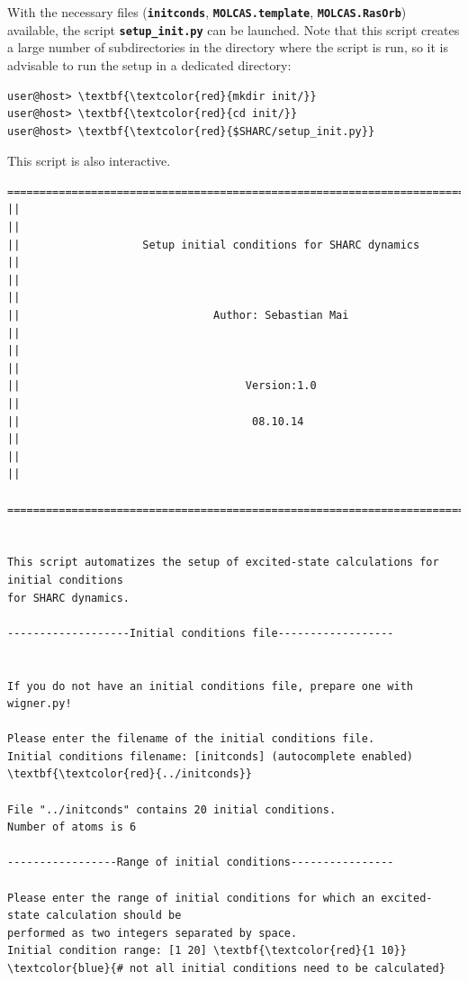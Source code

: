 \documentclass[a4paper,11pt,DIV=15,openany]{scrbook}
\newcommand{\ttt}[1]{\textbf{\texttt{#1}}}
\begin{document}
With the necessary files (\ttt{initconds}, \ttt{MOLCAS.template}, \ttt{MOLCAS.RasOrb}) available, the script \ttt{setup\_init.py} can be launched.
Note that this script creates a large number of subdirectories in the directory where the script is run, so it is advisable to run the setup in a dedicated directory:
\begin{Verbatim}[commandchars=\\\{\}]
user@host> \textbf{\textcolor{red}{mkdir init/}}
user@host> \textbf{\textcolor{red}{cd init/}}
user@host> \textbf{\textcolor{red}{$SHARC/setup_init.py}}
\end{Verbatim}
This script is also interactive. 

\begin{oframed}
\footnotesize\begin{Verbatim}[commandchars=\\\{\}]
  ================================================================================
||                                                                                ||
||                   Setup initial conditions for SHARC dynamics                  ||
||                                                                                ||
||                              Author: Sebastian Mai                             ||
||                                                                                ||
||                                   Version:1.0                                  ||
||                                    08.10.14                                    ||
||                                                                                ||
  ================================================================================


This script automatizes the setup of excited-state calculations for initial conditions
for SHARC dynamics.

-------------------Initial conditions file------------------


If you do not have an initial conditions file, prepare one with wigner.py!

Please enter the filename of the initial conditions file.
Initial conditions filename: [initconds] (autocomplete enabled) \textbf{\textcolor{red}{../initconds}}

File "../initconds" contains 20 initial conditions.
Number of atoms is 6

-----------------Range of initial conditions----------------

Please enter the range of initial conditions for which an excited-state calculation should be 
performed as two integers separated by space.
Initial condition range: [1 20] \textbf{\textcolor{red}{1 10}}    \textcolor{blue}{# not all initial conditions need to be calculated}


\end{Verbatim}
\end{oframed}
\end{document}
